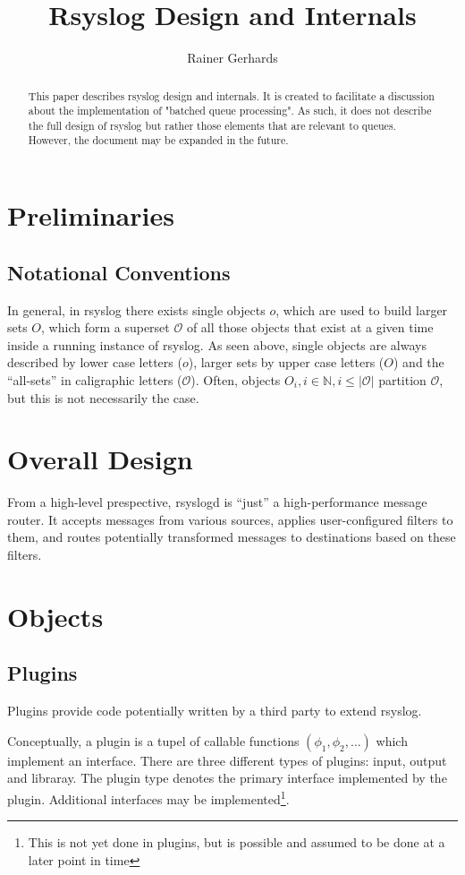 \documentclass[a4paper,10pt]{article}
\title{Rsyslog Design and Internals}
\author{Rainer Gerhards}
\newcommand{\IN}{\mathbb{N}}
\begin{document}
\maketitle

\begin{abstract}
This paper describes rsyslog design and internals. It is created to facilitate a discussion about the implementation of "batched queue processing". As such, it does not describe the full design of rsyslog but rather those elements that are relevant to queues. However, the document may be expanded in the future.
\end{abstract}

\tableofcontents

\section{Preliminaries}
\subsection{Notational Conventions}
In general, in rsyslog there exists single objects $o$, which are used to build larger sets $O$, which form a superset $\mathcal{O}$ of all those objects that exist at a given time inside a running instance of rsyslog. As seen above, single objects are always described by lower case letters ($o$), larger sets by upper case letters ($O$) and the ``all-sets'' in caligraphic letters ($\mathcal{O}$). Often, objects $O_i, i \in \IN, i \le |\mathcal{O}|$ partition $\mathcal{O}$, but this is not necessarily the case.

\section{Overall Design}
From a high-level prespective, rsyslogd is ``just'' a high-performance message router. It accepts messages from various sources, applies user-configured filters to them, and routes potentially transformed messages to destinations based on these filters.
\section{Objects}
\subsection{Plugins}
Plugins provide code potentially written by a third party to extend rsyslog.

Conceptually, a plugin is a tupel of callable functions $(\phi_1, \phi_2, \ldots)$ which implement an interface. There are three different types of plugins: input, output and libraray. The plugin type denotes the primary interface implemented by the plugin. Additional interfaces may be implemented\footnote{This is not yet done in plugins, but is possible and assumed to be done at a later point in time}.
\end{document}
